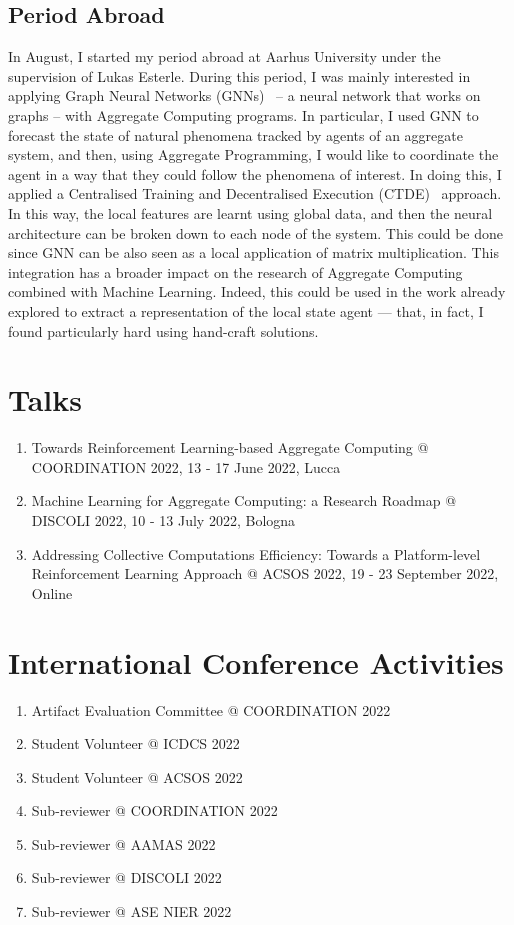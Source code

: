 \documentclass[11pt]{article}
\begin{document}
\subsection{Period Abroad}
In August, I started my period abroad 
 at Aarhus University under the supervision of Lukas Esterle.
%
During this period, I was mainly interested in applying Graph Neural Networks (GNNs)~\cite{scarselli2008graph}
 -- a neural network that works on graphs -- 
 with Aggregate Computing programs.
%
In particular, I used GNN to forecast 
 the state of natural phenomena tracked by agents of an aggregate system, and then, 
 using Aggregate Programming, I would like to coordinate the agent in a way 
 that they could follow the phenomena of interest.
%
In doing this, I applied a Centralised Training and Decentralised Execution (CTDE)~\cite{foerster2018deep} approach. 
%
In this way, the local features are learnt using global data, 
 and then the neural architecture can be broken down to each node of the system.
%
This could be done since GNN can be also seen as a local application of matrix multiplication.
%
This integration has a broader impact on the research of Aggregate Computing combined with Machine Learning. 
%
Indeed, this could be used in the work already 
 explored to extract a representation of the local state agent 
 --- that, in fact, I found particularly hard using hand-craft solutions. 

\section{Talks}
\begin{enumerate}
	\item Towards Reinforcement Learning-based Aggregate Computing @ COORDINATION 2022, 13 - 17 June 2022, Lucca
	\item Machine Learning for Aggregate Computing: a Research Roadmap @ DISCOLI 2022, 10 - 13 July 2022, Bologna
	\item Addressing Collective Computations Efficiency: Towards a Platform-level Reinforcement Learning Approach @ ACSOS 2022, 19 - 23 September 2022, Online
\end{enumerate}
\section{International Conference Activities}
\begin{enumerate}
	\item Artifact Evaluation Committee @ COORDINATION 2022
	\item Student Volunteer @ ICDCS 2022
	\item Student Volunteer @ ACSOS 2022
	\item Sub-reviewer @ COORDINATION 2022
	\item Sub-reviewer @ AAMAS 2022
	\item Sub-reviewer @ DISCOLI 2022
	\item Sub-reviewer @ ASE NIER 2022
\end{enumerate}
\end{document}
